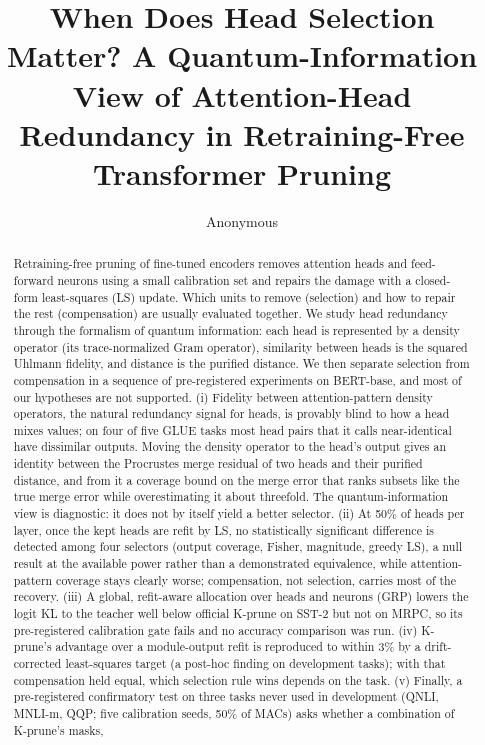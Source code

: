 \documentclass[11pt]{article}
\title{When Does Head Selection Matter? A Quantum-Information View of Attention-Head Redundancy in Retraining-Free Transformer Pruning}
\author{Anonymous}
\date{}
\begin{document}
\maketitle

\begin{abstract}
Retraining-free pruning of fine-tuned encoders removes attention heads and feed-forward neurons using a small
calibration set and repairs the damage with a closed-form least-squares (LS) update. Which units to remove (selection) and how to
repair the rest (compensation) are usually evaluated together. We study head redundancy through the formalism of quantum
information: each head is represented by a density operator (its trace-normalized Gram operator), similarity between heads is the
squared Uhlmann fidelity, and distance is the purified distance. We then separate selection from compensation in a sequence of pre-registered
experiments on BERT-base, and most of our hypotheses are not supported. (i) Fidelity between attention-pattern density operators, the natural
redundancy signal for heads, is provably blind to how a head mixes values; on four of five GLUE tasks most head pairs that it
calls near-identical have dissimilar outputs. Moving the density operator to the head's output gives an identity between the
Procrustes merge residual of two heads and their purified distance, and from it a coverage bound on the merge error that ranks
subsets like the true merge error while overestimating it about threefold. The quantum-information view is diagnostic: it does not by
itself yield a better selector. (ii) At 50\% of heads per layer, once the kept heads are refit by LS,
no statistically significant difference is detected among four selectors (output coverage, Fisher, magnitude, greedy LS), a null result at the available power rather than a demonstrated equivalence, while attention-pattern coverage stays clearly worse; compensation, not selection, carries most of the recovery. (iii) A global,
refit-aware allocation over heads and neurons (GRP) lowers the logit KL to the teacher well below official K-prune on
SST-2 but not on MRPC, so its pre-registered calibration gate fails and no accuracy comparison was run. (iv) K-prune's
advantage over a module-output refit is reproduced to within 3\% by a drift-corrected least-squares target (a post-hoc finding on development tasks); with that
compensation held equal, which selection rule wins depends on the task. (v) Finally, a pre-registered confirmatory test on
three tasks never used in development (QNLI, MNLI-m, QQP; five calibration seeds, 50\% of MACs) asks whether a combination of K-prune's masks,

\end{abstract}
\end{document}
